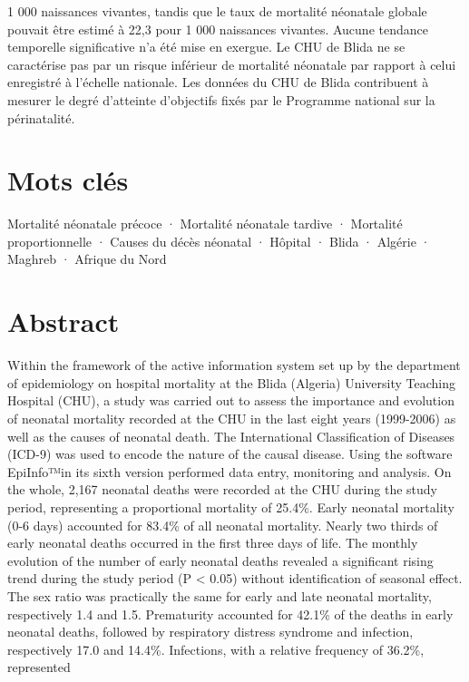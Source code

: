 \documentclass[
]{book}
\begin{document}
1 000 naissances vivantes, tandis que le taux de mortalité
néonatale globale pouvait être estimé à 22,3 pour 1 000 naissances
vivantes. Aucune tendance temporelle significative n'a
été mise en exergue. Le CHU de Blida ne se caractérise pas par
un risque inférieur de mortalité néonatale par rapport à celui
enregistré à l'échelle nationale. Les données du CHU de Blida
contribuent à mesurer le degré d'atteinte d'objectifs fixés par
le Programme national sur la périnatalité.

\hypertarget{mots-cluxe9s}{%
\section{Mots clés}\label{mots-cluxe9s}}

Mortalité néonatale précoce ·
Mortalité néonatale tardive · Mortalité proportionnelle ·
Causes du décès néonatal · Hôpital · Blida · Algérie ·
Maghreb · Afrique du Nord

\hypertarget{abstract}{%
\section{Abstract}\label{abstract}}

Within the framework of the active information
system set up by the department of epidemiology on hospital
mortality at the Blida (Algeria) University Teaching Hospital
(CHU), a study was carried out to assess the importance and
evolution of neonatal mortality recorded at the CHU in the
last eight years (1999-2006) as well as the causes of neonatal
death. The International Classification of Diseases (ICD-9)
was used to encode the nature of the causal disease. Using the
software EpiInfo™in its sixth version performed data entry,
monitoring and analysis. On the whole, 2,167 neonatal
deaths were recorded at the CHU during the study period,
representing a proportional mortality of 25.4\%. Early
neonatal mortality (0-6 days) accounted for 83.4\% of all
neonatal mortality. Nearly two thirds of early neonatal deaths
occurred in the first three days of life. The monthly evolution
of the number of early neonatal deaths revealed a significant
rising trend during the study period (P \textless{} 0.05) without
identification of seasonal effect. The sex ratio was practically
the same for early and late neonatal mortality, respectively
1.4 and 1.5. Prematurity accounted for 42.1\% of the deaths
in early neonatal deaths, followed by respiratory distress
syndrome and infection, respectively 17.0 and 14.4\%.
Infections, with a relative frequency of 36.2\%, represented
\end{document}
